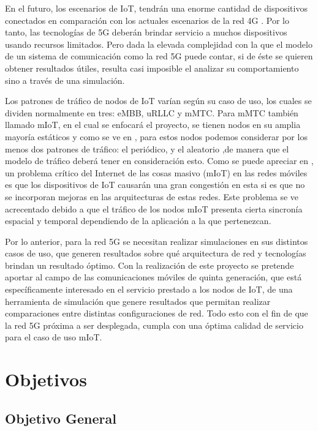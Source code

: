 En el futuro, los escenarios de IoT, tendrán una enorme cantidad de dispositivos conectados en comparación con los actuales escenarios de la red 4G \parencite{Whatis5G}. Por lo tanto, las tecnologías de 5G deberán brindar servicio a muchos dispositivos usando recursos limitados. Pero dada la elevada complejidad con la que el modelo de un sistema de comunicación como la red 5G puede contar, si de éste se quieren obtener resultados útiles, resulta casi imposible el analizar su comportamiento sino a través de una simulación.\newline

Los patrones de tráfico de nodos de IoT varían según su caso de uso, los cuales se dividen normalmente en tres: eMBB, uRLLC y mMTC. Para mMTC también llamado mIoT, en el cual se enfocará el proyecto, se tienen nodos en su amplia mayoría estáticos y como se ve en \parencite{IoTTrafficHossfeld}, para estos nodos podemos considerar por los menos dos patrones de tráfico: el periódico, y el aleatorio ,de manera que el modelo de tráfico deberá tener en consideración esto. Como se puede apreciar en \parencite{IoTTrafficHossfeld}, un problema crítico del Internet de las cosas masivo (mIoT) en las redes móviles es que los dispositivos de IoT causarán una gran congestión en esta si es que no se incorporan mejoras en las arquitecturas de estas redes. Este problema se ve acrecentado debido a que el tráfico de los nodos mIoT presenta cierta sincronía espacial y temporal dependiendo de la aplicación a la que pertenezcan.\newline

Por lo anterior, para la red 5G se necesitan realizar simulaciones en sus distintos casos de uso, que generen resultados sobre qué arquitectura de red y tecnologías brindan un resultado óptimo. Con la realización de este proyecto se pretende aportar al campo de las comunicaciones móviles de quinta generación, que está específicamente interesado en el servicio prestado a los nodos de IoT, de una herramienta de simulación que genere resultados que permitan realizar comparaciones entre distintas configuraciones de red. Todo esto con el fin de que la red 5G próxima a ser desplegada, cumpla con una óptima calidad de servicio para el caso de uso mIoT.\newline

\section{Objetivos}
\subsection{Objetivo General}

